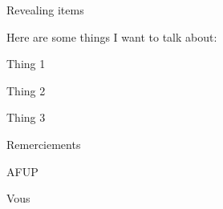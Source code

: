 \documentclass{beamer}
\begin{document}
\begin{frame}{Revealing items}

	\newenvironment{wideitemize}{\itemize\addtolength{\itemsep}{10pt}}{\enditemize}

	Here are some things I want to talk about:\\
	\vspace{.5cm}
	\begin{wideitemize}
		\item<1->{Thing 1}
		\item<2->{Thing 2}
		\item<3>{Thing 3}
	\end{wideitemize}
\end{frame}

\begin{frame}{Remerciements}

	\newenvironment{wideitemize}{\itemize\addtolength{\itemsep}{10pt}}{\enditemize}

	\vspace{.5cm}
	\begin{wideitemize}
		\item<1->{AFUP}
		\item<2->{Vous}
	\end{wideitemize}
\end{frame}
\end{document}
